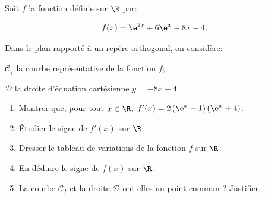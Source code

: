 \bigskip

Soit $f$ la fonction définie sur $\R$ par: 

\[f(x)=\e^{2x} + 6 \e^{x} - 8x-4.\]

\begin{list}{\textbullet}{Dans le plan rapporté à un repère orthogonal, on considère:}
\item $\mathcal{C}_f$ la courbe représentative de la fonction $f$;
\item $\mathcal{D}$ la droite d'équation cartésienne $y=-8x-4$.
\end{list}

\medskip

\begin{enumerate}
\item Montrer que, pour tout $x \in \R$, $f'(x)=2\left (\e^{x}-1\right )\left (\e^{x}+4\right )$.
\item Étudier le signe de $f'(x)$ sur $\R$.
\item Dresser le tableau de variations de la fonction $f$ sur $\R$.
\item En déduire le signe de $f(x)$ sur $\R$.
\item La courbe $\mathcal{C}_f$ et la droite $\mathcal{D}$ ont-elles un point commun ? Justifier.
\end{enumerate}
